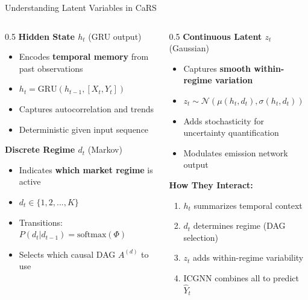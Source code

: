 \documentclass[aspectratio=169]{beamer}
\begin{document}
\begin{frame}{Understanding Latent Variables in CaRS}
\begin{columns}
\begin{column}{0.5\textwidth}
\textbf{Hidden State $h_t$} (GRU output)
\begin{itemize}
    \item Encodes \textbf{temporal memory} from past observations
    \item $h_t = \text{GRU}(h_{t-1}, [X_t, Y_t])$
    \item Captures autocorrelation and trends
    \item Deterministic given input sequence
\end{itemize}

\vspace{0.3cm}
\textbf{Discrete Regime $d_t$} (Markov)
\begin{itemize}
    \item Indicates \textbf{which market regime} is active
    \item $d_t \in \{1, 2, ..., K\}$
    \item Transitions: $P(d_t | d_{t-1}) = \text{softmax}(\Phi)$
    \item Selects which causal DAG $A^{(d)}$ to use
\end{itemize}
\end{column}

\begin{column}{0.5\textwidth}
\textbf{Continuous Latent $z_t$} (Gaussian)
\begin{itemize}
    \item Captures \textbf{smooth within-regime variation}
    \item $z_t \sim \mathcal{N}(\mu(h_t, d_t), \sigma(h_t, d_t))$
    \item Adds stochasticity for uncertainty quantification
    \item Modulates emission network output
\end{itemize}

\vspace{0.3cm}
\textbf{How They Interact:}
\begin{enumerate}
    \item $h_t$ summarizes temporal context
    \item $d_t$ determines regime (DAG selection)
    \item $z_t$ adds within-regime variability
    \item ICGNN combines all to predict $\hat{Y}_t$
\end{enumerate}
\end{column}
\end{columns}
\end{frame}
\end{document}
